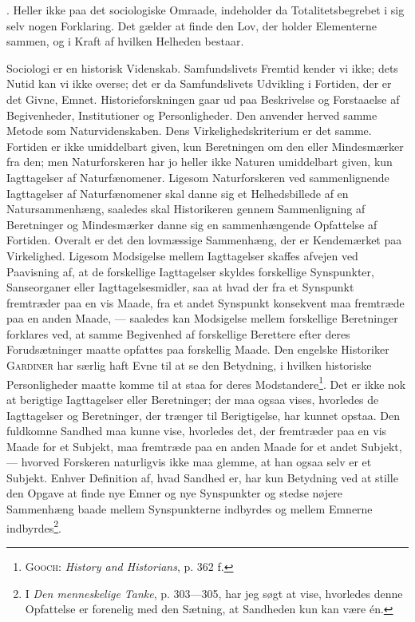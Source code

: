 \documentclass[12pt]{article}
\newcommand{\opage}[1]{\marginnote{\footnotesize\textit{[#1]}}}
\begin{document}
. Heller ikke paa det sociologiske Omraade, indeholder da Totalitetsbegrebet
i sig selv nogen Forklaring. Det gælder at finde den Lov, der holder Elementerne
sammen, og i Kraft af hvilken Helheden bestaar.

Sociologi er en historisk Videnskab. Samfundslivets Fremtid kender vi ikke;
dets Nutid kan vi ikke overse; det er da Samfundslivets Udvikling i Fortiden, der
er det Givne, Emnet. Historieforskningen gaar ud paa Beskrivelse og Forstaaelse af
Begivenheder, Institutioner og Personligheder. Den anvender herved samme Metode
som Naturvidenskaben. Dens Virkelighedskriterium er det samme. Fortiden er ikke
umiddelbart given, kun Beretningen om den eller Mindesmærker fra den; men
Naturforskeren har jo heller ikke Naturen umiddelbart given, kun Iagttagelser af
Naturfænomener. Ligesom Naturforskeren ved sammenlignende Iagttagelser af
\setcounter{footnote}{0}%
\opage{64}Naturfænomener skal danne sig et Helhedsbillede af en Natursammenhæng, saaledes
skal Historikeren gennem Sammenligning af Beretninger og Mindesmærker danne sig en
sammenhængende Opfattelse af Fortiden. Overalt er det den lovmæssige Sammenhæng,
der er Kendemærket paa Virkelighed. Ligesom Modsigelse mellem Iagttagelser skaffes
afvejen ved Paavisning af, at de forskellige Iagttagelser skyldes forskellige
Synspunkter, Sanseorganer eller Iagttagelsesmidler, saa at hvad der fra et
Synspunkt fremtræder paa en vis Maade, fra et andet Synspunkt konsekvent maa
fremtræde paa en anden Maade, --- saaledes kan Modsigelse mellem forskellige
Beretninger forklares ved, at samme Begivenhed af forskellige Berettere efter
deres Forudsætninger maatte opfattes paa forskellig Maade. Den engelske Historiker
\textsc{Gardiner} har særlig haft Evne til at se den Betydning, i hvilken
historiske Personligheder maatte komme til at staa for deres
Modstandere\footnote{\textsc{Gooch}: \textit{History and Historians}, p. 362 f.}.
Det er ikke nok at berigtige Iagttagelser eller Beretninger; der maa ogsaa vises,
hvorledes de Iagttagelser og Beretninger, der trænger til Berigtigelse, har kunnet
opstaa. Den fuldkomne Sandhed maa kunne vise, hvorledes det, der fremtræder paa en
vis Maade for et Subjekt, maa fremtræde paa en anden Maade for et andet Subjekt,
--- hvorved Forskeren naturligvis ikke maa glemme, at han ogsaa selv er et
Subjekt. Enhver Definition af, hvad Sandhed er, har kun Betydning ved at stille den
Opgave at finde nye Emner og nye Synspunkter og stedse nøjere Sammenhæng baade
mellem Synspunkterne indbyrdes og mellem Emnerne indbyrdes\footnote{I \textit{Den
menneskelige Tanke}, p. 303---305, har jeg søgt at vise, hvorledes denne
Opfattelse er forenelig med den Sætning, at Sandheden kun kan være én.}.
\end{document}
